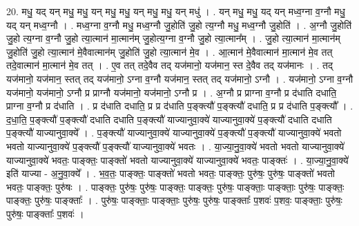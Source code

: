 \documentclass[17pt]{extarticle}
\begin{document}
20. मधु॒ यद् यन् मधु॒ मधु॒ यन् मधु॒ मधु॒ यन् मधु॒ मधु॒ यन् मधु॑ । . यन् मधु॒ मधु॒ यद् यन् मध्व॒ग्ना व॒ग्नौ मधु॒ यद् यन् मध्व॒ग्नौ । . मध्व॒ग्ना व॒ग्नौ मधु॒ मध्व॒ग्नौ जु॒होति॑ जु॒हो त्य॒ग्नौ मधु॒ मध्व॒ग्नौ जु॒होति॑ । . अ॒ग्नौ जु॒होति॑ जु॒हो त्य॒ग्ना व॒ग्नौ जु॒हो त्या॒त्मान॑ मा॒त्मान॑म् जु॒होत्य॒ग्ना व॒ग्नौ जु॒हो त्या॒त्मान᳚म् । . जु॒हो त्या॒त्मान॑ मा॒त्मान॑म् जु॒होति॑ जु॒हो त्या॒त्मान॑ मे॒वैवात्मान॑म् जु॒होति॑ जु॒हो त्या॒त्मान॑ मे॒व । . आ॒त्मान॑ मे॒वैवात्मान॑ मा॒त्मान॑ मे॒व तत् तदे॒वात्मान॑ मा॒त्मान॑ मे॒व तत् । . ए॒व तत् तदे॒वैव तद् यज॑मानो॒ यज॑मान॒ स्त दे॒वैव तद् यज॑मानः । . तद् यज॑मानो॒ यज॑मान॒ स्तत् तद् यज॑मानो॒ ऽग्ना व॒ग्नौ यज॑मान॒ स्तत् तद् यज॑मानो॒ ऽग्नौ । . यज॑मानो॒ ऽग्ना व॒ग्नौ यज॑मानो॒ यज॑मानो॒ ऽग्नौ प्र प्राग्नौ यज॑मानो॒ यज॑मानो॒ ऽग्नौ प्र । . अ॒ग्नौ प्र प्राग्ना व॒ग्नौ प्र द॑धाति दधाति॒ प्राग्ना व॒ग्नौ प्र द॑धाति । . प्र द॑धाति दधाति॒ प्र प्र द॑धाति प॒ङ्क्त्यौ॑ प॒ङ्क्त्यौ॑ दधाति॒ प्र प्र द॑धाति प॒ङ्क्त्यौ᳚ । . द॒धा॒ति॒ प॒ङ्क्त्यौ॑ प॒ङ्क्त्यौ॑ दधाति दधाति प॒ङ्क्त्यौ॑ याज्यानुवा॒क्ये॑ याज्यानुवा॒क्ये॑ प॒ङ्क्त्यौ॑ दधाति दधाति प॒ङ्क्त्यौ॑ याज्यानुवा॒क्ये᳚ । . प॒ङ्क्त्यौ॑ याज्यानुवा॒क्ये॑ याज्यानुवा॒क्ये॑ प॒ङ्क्त्यौ॑ प॒ङ्क्त्यौ॑ याज्यानुवा॒क्ये॑ भवतो भवतो याज्यानुवा॒क्ये॑ प॒ङ्क्त्यौ॑ प॒ङ्क्त्यौ॑ याज्यानुवा॒क्ये॑ भवतः । . या॒ज्या॒नु॒वा॒क्ये॑ भवतो भवतो याज्यानुवा॒क्ये॑ याज्यानुवा॒क्ये॑ भवतः॒ पाङ्क्तः॒ पाङ्क्तो॑ भवतो याज्यानुवा॒क्ये॑ याज्यानुवा॒क्ये॑ भवतः॒ पाङ्क्तः॑ । . या॒ज्या॒नु॒वा॒क्ये॑ इति॑ याज्या - अ॒नु॒वा॒क्ये᳚ । . भ॒व॒तः॒ पाङ्क्तः॒ पाङ्क्तो॑ भवतो भवतः॒ पाङ्क्तः॒ पुरु॑षः॒ पुरु॑षः॒ पाङ्क्तो॑ भवतो भवतः॒ पाङ्क्तः॒ पुरु॑षः । . पाङ्क्तः॒ पुरु॑षः॒ पुरु॑षः॒ पाङ्क्तः॒ पाङ्क्तः॒ पुरु॑षः॒ पाङ्क्ताः॒ पाङ्क्ताः॒ पुरु॑षः॒ पाङ्क्तः॒ पाङ्क्तः॒ पुरु॑षः॒ पाङ्क्ताः᳚ । . पुरु॑षः॒ पाङ्क्ताः॒ पाङ्क्ताः॒ पुरु॑षः॒ पुरु॑षः॒ पाङ्क्ताः᳚ प॒शवः॑ प॒शवः॒ पाङ्क्ताः॒ पुरु॑षः॒ पुरु॑षः॒ पाङ्क्ताः᳚ प॒शवः॑ । \newline
\end{document}
